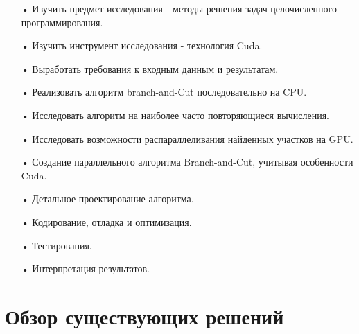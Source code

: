 \documentclass[a4paper,14pt,russian]{extreport}
\begin{document}
  \begin{itemize}
  \item[•] Изучить предмет исследования - методы решения задач целочисленного программирования.
  \item[•] Изучить инструмент исследования - технология Cuda.
  \item[•] Выработать требования к входным данным и результатам.
  \item[•] Реализовать алгоритм branch-and-Cut последовательно на CPU.
  \item[•] Исследовать алгоритм на наиболее часто повторяющиеся вычисления.
  \item[•] Исследовать возможности распараллеливания найденных участков на GPU.
  \item[•] Создание параллельного алгоритма Branch-and-Cut, учитывая особенности Cuda.
  \item[•] Детальное проектирование алгоритма.
  \item[•] Кодирование, отладка и оптимизация.
  \item[•] Тестирования.
  \item[•] Интерпретация результатов.
  \end{itemize}


\section{Обзор существующих решений}
\end{document}
